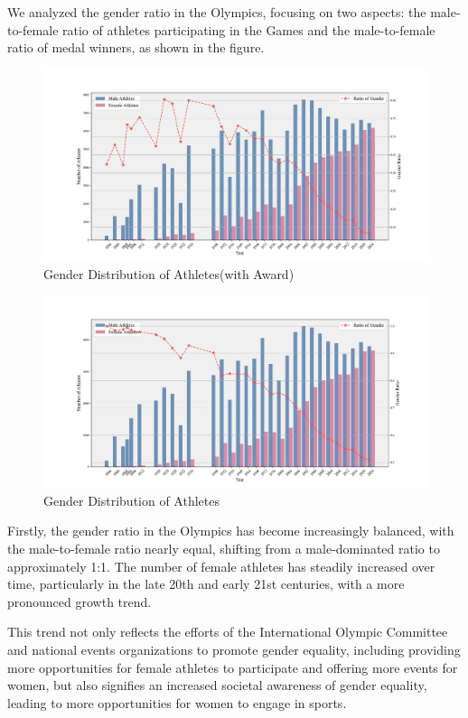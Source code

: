 \documentclass[12pt]{article}  %
\begin{document}
We analyzed the gender ratio in the Olympics, focusing on two aspects: the male-to-female ratio of athletes participating in the Games and the male-to-female ratio of medal winners, as shown in the figure.

	\begin{figure}[H]
		\centering
		\includegraphics[width=12cm]{img/Gender with Award.png}
		\caption{Gender Distribution of Athletes(with Award)}
		\label{fig:aa}
	\end{figure}
	
	\begin{figure}[H]
		\centering
		\includegraphics[width=12cm]{img/Gender.png}
		\caption{Gender Distribution of Athletes}
		\label{fig:aa}
	\end{figure}
	
Firstly, the gender ratio in the Olympics has become increasingly balanced, with the male-to-female ratio nearly equal, shifting from a male-dominated ratio to approximately 1:1. The number of female athletes has steadily increased over time, particularly in the late 20th and early 21st centuries, with a more pronounced growth trend.

This trend not only reflects the efforts of the International Olympic Committee and national events organizations to promote gender equality, including providing more opportunities for female athletes to participate and offering more events for women, but also signifies an increased societal awareness of gender equality, leading to more opportunities for women to engage in sports.
\end{document}
